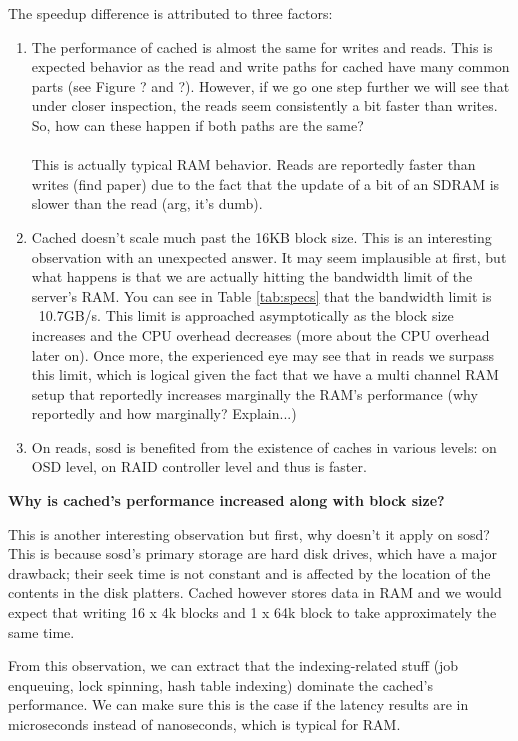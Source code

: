 The speedup difference is attributed to three factors:

\begin{enumerate}
	\item The performance of cached is almost the same for writes and reads.  
		This is expected behavior as the read and write paths for cached have 
		many common parts (see Figure ? and ?). However, if we go one step 
		further we will see that under closer inspection, the reads seem 
		consistently a bit faster than writes. So, how can these happen if both 
		paths are the same? \\
		\\
		This is actually typical RAM behavior. Reads are reportedly faster than 
		writes (find paper) due to the fact that the update of a bit of an 
		SDRAM is slower than the read (arg, it's dumb).
	\item Cached doesn't scale much past the 16KB block size. This is an 
		interesting observation with an unexpected answer. It may seem 
		implausible at first, but what happens is that we are actually hitting 
		the bandwidth limit of the server's RAM. You can see in Table 
		\ref{tab:specs} that the bandwidth limit is ~10.7GB/s. This limit is 
		approached asymptotically as the block size increases and the CPU 
		overhead decreases (more about the CPU overhead later on). Once more, 
		the experienced eye may see that in reads we surpass this limit, which 
		is logical given the fact that we have a multi channel RAM setup that 
		reportedly increases marginally the RAM's performance (why reportedly 
		and how marginally? Explain...)
	\item On reads, sosd is benefited from the existence of caches in various 
		levels: on OSD level, on RAID controller level and thus is faster.
\end{enumerate}

\textbf{Why is cached's performance increased along with block size?}

This is another interesting observation but first, why doesn't it apply on 
sosd? This is because sosd's primary storage are hard disk drives, which have a 
major drawback; their seek time is not constant and is affected by the location 
of the contents in the disk platters. Cached however stores data in RAM and we 
would expect that writing 16 x 4k blocks and 1 x 64k block to take 
approximately the same time.

From this observation, we can extract that the indexing-related stuff (job 
enqueuing, lock spinning, hash table indexing) dominate the cached's 
performance. We can make sure this is the case if the latency results are in
microseconds instead of nanoseconds, which is typical for RAM.

